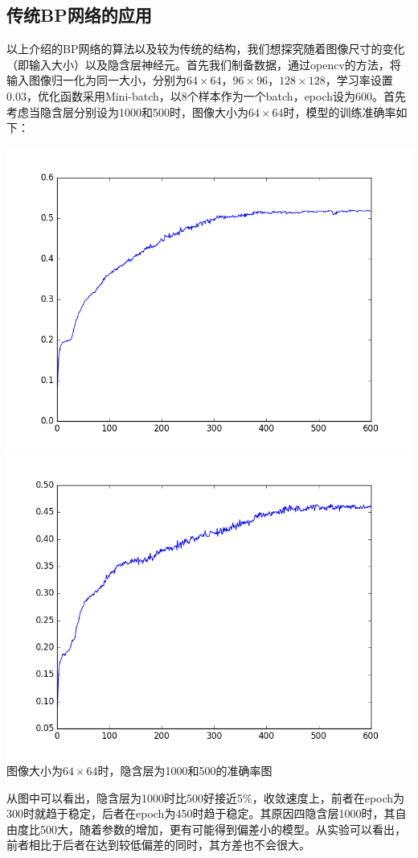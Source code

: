 \subsection{传统BP网络的应用}
以上介绍的BP网络的算法以及较为传统的结构，我们想探究随着图像尺寸的变化（即输入大小）以及隐含层神经元。首先我们制备数据，通过opencv的方法，将输入图像归一化为同一大小，分别为$64\times 64$，$96\times 96$，$128\times 128$，学习率设置0.03，优化函数采用Mini-batch，以8个样本作为一个batch，epoch设为600。首先考虑当隐含层分别设为1000和500时，图像大小为$64\times 64$时，模型的训练准确率如下：
\begin{center}
\includegraphics[scale=0.4]{../figures/Log/BP_new1/BP_new1_acc.png}
\includegraphics[scale=0.4]{../figures/Log/BP_new4/BP_new4_acc.png} \\
图像大小为$64\times 64$时，隐含层为1000和500的准确率图
\end{center}
从图中可以看出，隐含层为1000时比500好接近5\%，收敛速度上，前者在epoch为300时就趋于稳定，后者在epoch为450时趋于稳定。其原因四隐含层1000时，其自由度比500大，随着参数的增加，更有可能得到偏差小的模型。从实验可以看出，前者相比于后者在达到较低偏差的同时，其方差也不会很大。

